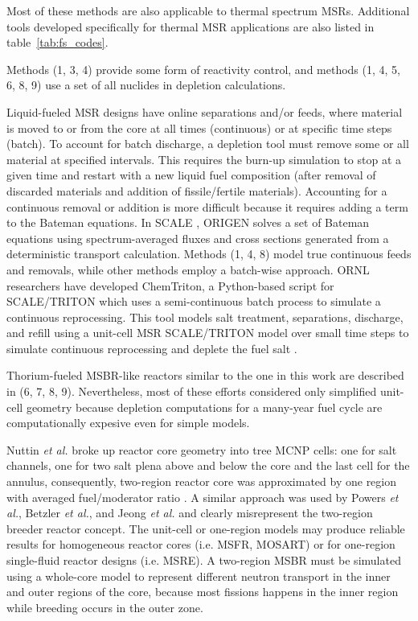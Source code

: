 Most of these methods are also applicable to thermal spectrum \glspl{MSR}. 
Additional tools developed specifically for thermal \gls{MSR} applications are 
also listed in table~\ref{tab:fs_codes}.

Methods (1, 3, 4) provide some form of reactivity control, and methods (1, 4, 
5, 6, 8, 9) use a set of all nuclides in depletion calculations. 

Liquid-fueled \gls{MSR} designs have online separations and/or feeds, where 
material is moved to or from the core at all times (continuous) or at specific 
time steps (batch). To account for batch discharge, a depletion tool must 
remove some or all material at specified intervals. This requires the burn-up 
simulation to stop at a given time and restart with a new liquid fuel 
composition (after removal of discarded materials and addition of 
fissile/fertile materials). Accounting for a continuous removal or addition is 
more difficult because it requires adding a term to the Bateman equations. In 
SCALE \cite{bowman_scale_2011}, ORIGEN \cite{gauld_isotopic_2011} solves a set 
of Bateman equations using spectrum-averaged fluxes and cross sections 
generated from a deterministic transport calculation. Methods (1, 4, 8) model 
true continuous feeds and removals, while other methods employ a batch-wise 
approach. \gls{ORNL} researchers have developed ChemTriton, a Python-based 
script for SCALE/TRITON which uses a semi-continuous batch process to simulate 
a continuous reprocessing. This tool models salt treatment, separations, 
discharge, and refill using a unit-cell \gls{MSR} SCALE/TRITON model over small 
time steps to simulate continuous reprocessing and deplete the fuel salt 
\cite{powers_new_2013}.

Thorium-fueled \gls{MSBR}-like reactors similar to the one in this work are 
described in (6, 7, 8, 9). Nevertheless, most of these efforts considered only 
simplified unit-cell geometry because depletion computations for a many-year 
fuel cycle are computationally expesive even for simple models. 

Nuttin \emph{et al.} broke up reactor core geometry into tree \gls{MCNP} cells: 
one for salt channels, one for two salt plena above and below the core and the 
last cell for the annulus, consequently, two-region reactor core was 
approximated by one region with averaged fuel/moderator ratio 
\cite{nuttin_potential_2005}.  A similar approach was used by Powers \emph{et 
al.}, Betzler \emph{et al.}, and Jeong \emph{et al.} 
\cite{powers_new_2013,powers_inventory_2014,betzler_modeling_2016, 
betzler_molten_2017, jeong_development_2014, jeong_equilibrium_2016} and 
clearly misrepresent the two-region breeder reactor concept. The unit-cell or 
one-region models may produce reliable results for homogeneous reactor cores 
(i.e. \gls{MSFR}, \gls{MOSART}) or for one-region single-fluid reactor designs 
(i.e. \gls{MSRE}). A two-region \gls{MSBR} must be simulated using a whole-core 
model to represent different neutron transport in the inner and outer regions 
of the core, because most fissions happens in the inner region while breeding 
occurs in the outer zone.  

